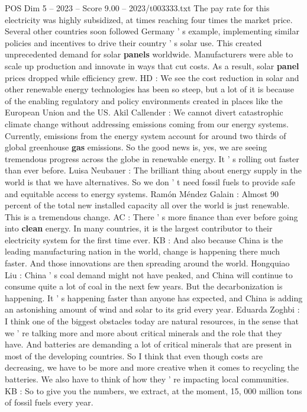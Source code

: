 \begin{textsample}{POS Dim 5 – 2023 – Score 9.00 – 2023/t003333.txt}
The pay rate for this electricity was highly subsidized, at times reaching four times the market price.
Several other countries soon followed Germany ' s example, implementing similar policies and incentives to drive their country ' s solar use.
This created unprecedented demand for solar \textbf{panels} worldwide.
Manufacturers were able to scale up production and innovate in ways that cut costs.
As a result, solar \textbf{panel} prices dropped while efficiency grew.
HD : We see the cost reduction in solar and other renewable energy technologies has been so steep, but a lot of it is because of the enabling regulatory and policy environments created in places like the European Union and the US.
Akil Callender : We cannot divert catastrophic climate change without addressing emissions coming from our energy systems.
Currently, emissions from the energy system account for around two thirds of global greenhouse \textbf{gas} emissions.
So the good news is, yes, we are seeing tremendous progress across the globe in renewable energy.
It ' s rolling out faster than ever before.
Luisa Neubauer : The brilliant thing about energy supply in the world is that we have alternatives.
So we don ' t need fossil fuels to provide safe and equitable access to energy systems.
Ramón Méndez Galain : Almost 90 percent of the total new installed capacity all over the world is just renewable.
This is a tremendous change.
AC : There ' s more finance than ever before going into \textbf{clean} energy.
In many countries, it is the largest contributor to their electricity system for the first time ever.
KB : And also because China is the leading manufacturing nation in the world, change is happening there much faster.
And those innovations are then spreading around the world.
Hongquiao Liu : China ' s coal demand might not have peaked, and China will continue to consume quite a lot of coal in the next few years.
But the decarbonization is happening.
It ' s happening faster than anyone has expected, and China is adding an astonishing amount of wind and solar to its grid every year.
Eduarda Zoghbi : I think one of the biggest obstacles today are natural resources, in the sense that we ' re talking more and more about critical minerals and the role that they have.
And batteries are demanding a lot of critical minerals that are present in most of the developing countries.
So I think that even though costs are decreasing, we have to be more and more creative when it comes to recycling the batteries.
We also have to think of how they ' re impacting local communities.
KB : So to give you the numbers, we extract, at the moment, 15, 000 million tons of fossil fuels every year.

\end{textsample}
